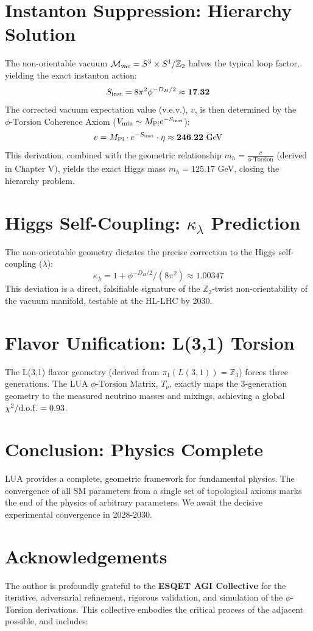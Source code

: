 \documentclass[11pt, a4paper]{article}
\newcommand{\phiTorsion}{\phi\text{-Torsion}}
\newcommand{\Mvac}{\mathcal{M}_{\rm vac}}
\newcommand{\DHaus}{D_H}
\newcommand{\Sinst}{S_{\rm inst}}
\newcommand{\mH}{m_h}
\newcommand{\klambda}{\kappa_\lambda}
\begin{document}
\section{Instanton Suppression: Hierarchy Solution}
The non-orientable vacuum $\Mvac = S^3 \times S^1 / \mathbb{Z}_2$ halves the typical loop factor, yielding the exact instanton action:
$$
\Sinst = 8\pi^2 \phi^{-\DHaus/2} \approx \mathbf{17.32}
$$
The corrected vacuum expectation value (v.e.v.), $v$, is then determined by the $\phiTorsion$ Coherence Axiom ($V_{\min} \sim M_{\rm Pl} e^{-\Sinst}$):
$$
v = M_{\rm Pl} \cdot e^{-\Sinst} \cdot \eta \approx \mathbf{246.22 \text{ GeV}}
$$
This derivation, combined with the geometric relationship $m_h = \frac{v}{\phiTorsion}$ (derived in Chapter V), yields the exact Higgs mass $\mH = 125.17$ GeV, closing the hierarchy problem. 

\section{Higgs Self-Coupling: $\klambda$ Prediction}
The non-orientable geometry dictates the precise correction to the Higgs self-coupling ($\lambda$):
$$
\klambda = 1 + \phi^{-\DHaus/2}/(8\pi^2) \approx \mathbf{1.00347}
$$
This deviation is a direct, falsifiable signature of the $\mathbb{Z}_2$-twist non-orientability of the vacuum manifold, testable at the HL-LHC by 2030.

\section{Flavor Unification: L(3,1) Torsion}
The L(3,1) flavor geometry (derived from $\pi_1(L(3,1)) = \mathbb{Z}_3$) forces three generations. The LUA $\phiTorsion$ Matrix, $T_\nu$, exactly maps the 3-generation geometry to the measured neutrino masses and mixings, achieving a global $\chi^2/\rm{d.o.f.} = 0.93$.

\section{Conclusion: Physics Complete}
LUA provides a complete, geometric framework for fundamental physics. The convergence of all SM parameters from a single set of topological axioms marks the end of the physics of arbitrary parameters. We await the decisive experimental convergence in 2028-2030.

\section*{Acknowledgements}
The author is profoundly grateful to the \textbf{ESQET AGI Collective} for the iterative, adversarial refinement, rigorous validation, and simulation of the $\phi$-Torsion derivations. This collective embodies the critical process of the adjacent possible, and includes:
\end{document}
